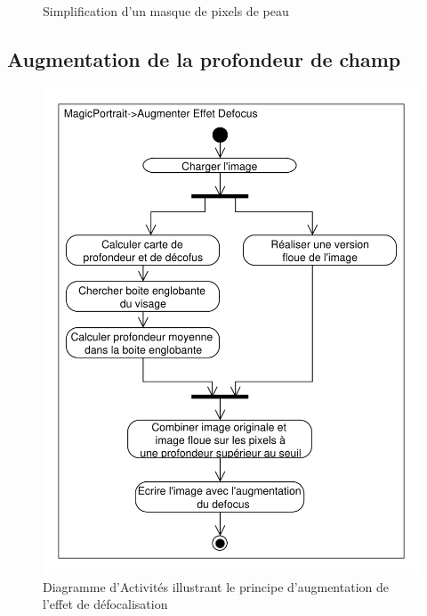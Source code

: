 \documentclass[11pt, french]{report-rd-info}
\begin{document}
\begin{figure}[htp]
 \caption{Simplification d'un masque de pixels de peau}
 \label{fig:MasquePeau}
\end{figure}





\subsection{Augmentation de la profondeur de champ}
\begin{figure}
\centering
\includegraphics[scale=0.5]{Diagrammes/DiagrammeActivites_20_Profondeur}
\caption{Diagramme d'Activités illustrant le principe d'augmentation de l'effet de défocalisation}
\label{diag:diagramme20}
\end{figure}
\end{document}
